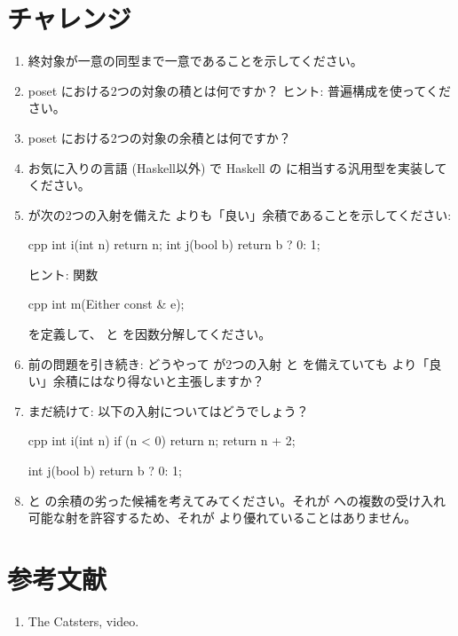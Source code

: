 \section{チャレンジ}

\begin{enumerate}
  \tightlist
  \item
        終対象が一意の同型まで一意であることを示してください。
  \item
        poset における2つの対象の積とは何ですか？ ヒント: 普遍構成を使ってください。
  \item
        poset における2つの対象の余積とは何ですか？
  \item
        お気に入りの言語 (Haskell以外) で Haskell の  に相当する汎用型を実装してください。
  \item
         が次の2つの入射を備えた  よりも「良い」余積であることを示してください: 

        \begin{snip}{cpp}
int i(int n) { return n; }
int j(bool b) { return b ? 0: 1; }
\end{snip}

        ヒント: 関数

        \begin{snip}{cpp}
int m(Either const & e);
\end{snip}

        を定義して、 と  を因数分解してください。
  \item
        前の問題を引き続き: どうやって  が2つの入射  と  を備えていても  より「良い」余積にはなり得ないと主張しますか？
  \item
        まだ続けて: 以下の入射についてはどうでしょう？

        \begin{snip}{cpp}
int i(int n) {
    if (n < 0) return n;
    return n + 2;
}

int j(bool b) { return b ? 0: 1; }
\end{snip}
  \item
         と  の余積の劣った候補を考えてみてください。それが  への複数の受け入れ可能な射を許容するため、それが  より優れていることはありません。
\end{enumerate}

\section{参考文献}

\begin{enumerate}
  \tightlist
  \item
        The Catsters,
         video.
\end{enumerate}


